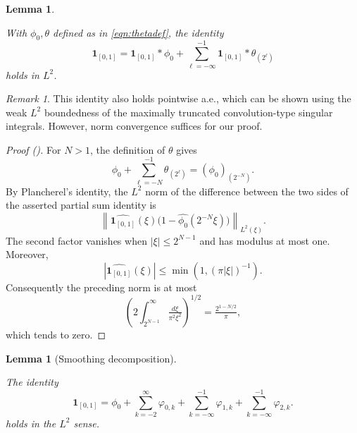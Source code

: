 \documentclass[12pt,reqno]{amsart}
\newcommand{\auto}{{({\tiny\faCar})}}
\theoremstyle{plain}
\newtheorem{lemma}[theorem]{Lemma}
\numberwithin{equation}{section}
\theoremstyle{remark}
\newtheorem{rem}{Remark}[section]
\newcommand{\uses}[1]{}
\newcommand{\usesdefs}[1]{}
\newcommand{\leanok}{}
\newcommand{\lean}[1]{}
\begin{document}
\begin{lemma}\label{lem:chardecomp}\uses{}\usesdefs{def:cn-window,def:unipair,defn:window based bump functions}
\lean{Auto.charDecomp}
\leanok
With $\phi_0,\theta$ defined as in \eqref{eqn:thetadef}, the identity
 \begin{equation}\label{auto:indicator-smoothing-decomposition} \mathbf{1}_{[0,1]} = \mathbf{1}_{[0,1]}* \phi_0 +  \sum_{\ell=-\infty}^{-1} \mathbf{1}_{[0,1]} * \theta_{(2^\ell)}  \end{equation}
holds in $L^2$.
\end{lemma}

\begin{rem}
    This identity also holds pointwise a.e., which can be shown using the weak $L^2$ boundedness of the maximally truncated convolution-type singular integrals. However, norm  convergence   suffices for our proof.
\end{rem}


\begin{proof}[Proof \auto]
For $N>1$, the definition of $\theta$ gives
\[
\phi_0+\sum_{\ell=-N}^{-1}\theta_{(2^\ell)}
=(\phi_0)_{(2^{-N})}.
\]
By Plancherel's identity, the $L^2$ norm of the difference between the two sides of the asserted partial sum identity is
\[
\left\|\widehat{\mathbf1_{[0,1]}}(\xi)
\bigl(1-\widehat{\phi_0}(2^{-N}\xi)\bigr)\right\|_{L^2(\xi)}.
\]
The second factor vanishes when $|\xi|\le2^{N-1}$ and has modulus at most one. Moreover,
\[
|\widehat{\mathbf1_{[0,1]}}(\xi)|
\le\min(1,(\pi|\xi|)^{-1}).
\]
Consequently the preceding norm is at most
\[
\left(2\int_{2^{N-1}}^\infty\tfrac{d\xi}{\pi^2\xi^2}\right)^{1/2}
=\tfrac{2^{1-N/2}}{\pi},
\]
which tends to zero.
\end{proof}


\begin{lemma}[Smoothing decomposition]\label{lem:smoothingdecomp}\uses{lem:chardecomp,lem:bumpbasic}\usesdefs{def:cn-window,def:unipair,defn:window based bump functions}
\lean{Auto.smoothingDecomp}
\leanok
The identity
\begin{equation}\label{eq:seriesexpansion}
\mathbf{1}_{[0,1]} = \phi_0 + \sum_{k=-2}^\infty \varphi_{0,k}  + \sum_{k=-\infty}^{-1} \varphi_{1,k}+ \sum_{k=-\infty}^{-1}\varphi_{2,k}.
\end{equation}
holds in the $L^2$ sense.
\end{lemma}
\end{document}
